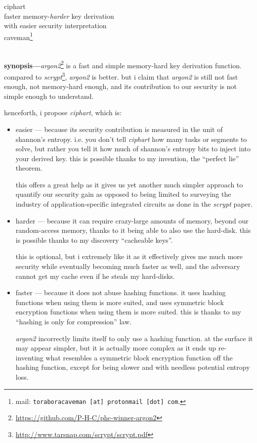 \documentclass[twocolumn]{article}
\begin{document}
\SetInd{.15em}{1em}

\begin{center}
\Huge
ciphart\\
\Large
faster memory-\emph{harder} key derivation \\
with easier security interpretation\\
\normalsize
caveman\footnote{mail: \texttt{toraboracaveman [at] protonmail [dot]
com}.}\\
\footnotesize
\DTMnow\\
\end{center}

\noindent\textbf{synopsis---}\emph{argon2}\footnote{\url{https://github.com/P-H-C/phc-winner-argon2}}
is a fast and simple memory-hard key derivation function.  compared to
\emph{scrypt}\footnote{\url{http://www.tarsnap.com/scrypt/scrypt.pdf}},
\emph{argon2} is better.  but i claim that \emph{argon2} is still not fast
enough, not memory-hard enough, and its contribution to our security is not
simple enough to understand.

henceforth, i propose \emph{ciphart}, which is:
\begin{itemize}
    \item easier --- because its security contribution is measured in the
    unit of shannon's entropy.  i.e. you don't tell \emph{ciphart} how many
    tasks or segments to solve, but rather you tell it how much of
    shannon's entropy bits to inject into your derived key.  this is
    possible thanks to my invention, the ``perfect lie'' theorem.

    this offers a great help as it gives us yet another much simpler
    approach to quantify our security gain as opposed to being limited to
    surveying the industry of application-specific integrated circuits as
    done in the \emph{scrypt} paper.

    \item harder --- because it can require crazy-large amounts of memory,
    beyond our random-access memory, thanks to it being able to also use
    the hard-disk.  this is possible thanks to my discovery ``cacheable
    keys''.

    this is optional, but i extremely like it as it effectively gives me
    much more security while eventually becoming much faster as well, and
    the adversary cannot get my cache even if he steals my hard-disks.

    \item faster --- because it does not abuse hashing functions.  it uses
    hashing functions when using them is more suited, and uses symmetric
    block encryption functions when using them is  more suited.  this is
    thanks to my ``hashing is only for compression'' law.

    \emph{argon2} incorrectly limits itself to only use a hashing function.
    at the surface it may appear simpler, but it is actually more complex
    as it ends up re-inventing what resembles a symmetric block encryption
    function off the hashing function, except for being slower and with
    needless potential entropy loss.
\end{itemize}
\end{document}
